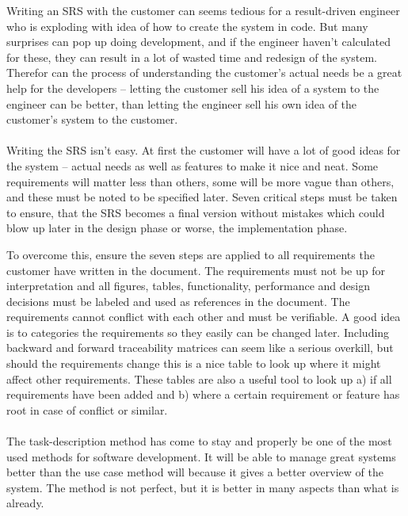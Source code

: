 \documentclass[Main]{subfiles}
\begin{document}
Writing an SRS with the customer can seems tedious for a result-driven engineer who is exploding with idea of how to create the system in code.
But many surprises can pop up doing development, and if the engineer haven't calculated for these, they can result in a lot of wasted time and redesign of the system.
Therefor can the process of understanding the customer's actual needs be a great help for the developers -- letting the customer sell his idea of a system to the engineer can be better, than letting the engineer sell his own idea of the customer's system to the customer.
\\
\\
Writing the SRS isn't easy.
At first the customer will have a lot of good ideas for the system -- actual needs as well as features to make it nice and neat.
Some requirements will matter less than others, some will be more vague than others, and these must be noted to be specified later.
Seven critical steps must be taken to ensure, that the SRS becomes a final version without mistakes which could blow up later in the design phase or worse, the implementation phase.

To overcome this, ensure the seven steps are applied to all requirements the customer have written in the document.
The requirements must not be up for interpretation and all figures, tables, functionality, performance and design decisions must be labeled and used as references in the document.
The requirements cannot conflict with each other and must be verifiable. 
A good idea is to categories the requirements so they easily can be changed later.
Including backward and forward traceability matrices can seem like a serious overkill, but should the requirements change this is a nice table to look up where it might affect other requirements.
These tables are also a useful tool to look up a) if all requirements have been added and b) where a certain requirement or feature has root in case of conflict or similar.
\\
\\
The task-description method has come to stay and properly be one of the most used methods for software development. 
It will be able to manage great systems better than the use case method will because it gives a better overview of the system.
The method is not perfect, but it is better in many aspects than what is already.
\end{document}
